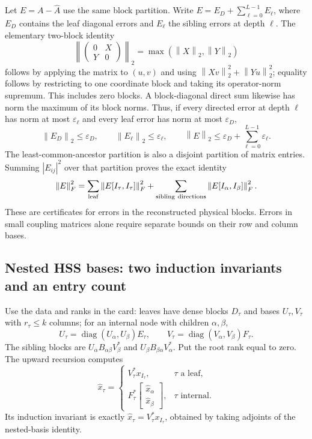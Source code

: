 \documentclass[11pt,a4paper]{article}
\newcommand{\norm}[1]{\left\lVert#1\right\rVert}
\DeclareMathOperator{\diag}{diag}
\begin{document}
Let $E=A-\widehat A$ use the same block partition. Write
$E=E_D+\sum_{\ell=0}^{L-1}E_\ell$, where $E_D$ contains the leaf
diagonal errors and $E_\ell$ the sibling errors at depth $\ell$.
The elementary two-block identity
\[
 \left\|\begin{pmatrix}0&X\\Y&0\end{pmatrix}\right\|_2
       =\max(\norm X_2,\norm Y_2)
\]
follows by applying the matrix to $(u,v)$ and using
$\norm{Xv}_2^2+\norm{Yu}_2^2$; equality follows by restricting to one
coordinate block and taking its operator-norm supremum. This includes
zero blocks. A block-diagonal direct sum likewise has norm the maximum
of its block norms. Thus, if every directed error at depth $\ell$ has
norm at most $\varepsilon_\ell$ and every leaf error has norm at most
$\varepsilon_D$,
\[
 \norm{E_D}_2\le\varepsilon_D,\qquad
 \norm{E_\ell}_2\le\varepsilon_\ell,\qquad
 \norm E_2\le\varepsilon_D+\sum_{\ell=0}^{L-1}\varepsilon_\ell.
\]
The least-common-ancestor partition is also a disjoint partition of
matrix entries. Summing $|E_{ij}|^2$ over that partition proves the exact
identity
\[
 \norm E_F^2=
 \sum_{\rm leaf}\norm{E[I_\tau,I_\tau]}_F^2
 +\sum_{\rm sibling\ directions}\norm{E[I_\alpha,I_\beta]}_F^2.
\]
These are certificates for errors in the reconstructed physical blocks.
Errors in small coupling matrices alone require separate bounds on their
row and column bases.

\subsection{Nested HSS bases: two induction invariants and an entry count}

Use the data and ranks in the card: leaves have dense blocks $D_\tau$
and bases $U_\tau,V_\tau$ with $r_\tau\le k$ columns; for an internal
node with children $\alpha,\beta$,
\[
 U_\tau=\diag(U_\alpha,U_\beta)E_\tau,
 \qquad V_\tau=\diag(V_\alpha,V_\beta)F_\tau.
\]
The sibling blocks are
$U_\alpha B_{\alpha\beta}V_\beta^*$ and
$U_\beta B_{\beta\alpha}V_\alpha^*$. Put the root rank equal to zero.
The upward recursion computes
\[
 \widehat x_\tau=
 \begin{cases}
 V_\tau^*x_{I_\tau},&\tau\text{ a leaf},\\
 F_\tau^*\begin{bmatrix}\widehat x_\alpha\\\widehat x_\beta\end{bmatrix},
       &\tau\text{ internal}.
 \end{cases}
\]
Its induction invariant is exactly
$\widehat x_\tau=V_\tau^*x_{I_\tau}$, obtained by taking adjoints of
the nested-basis identity.
\end{document}
